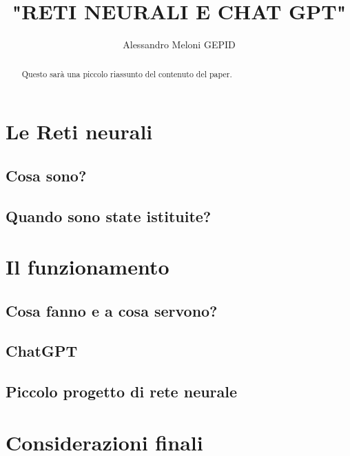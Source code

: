 \documentclass{article}
\title{\textbf{"RETI NEURALI E CHAT GPT"}}
\author{Alessandro Meloni GEPID}
\date{}
\begin{document}
\maketitle
\begin{abstract}
    Questo sarà una piccolo riassunto del contenuto del paper.
\end{abstract}

\centering \tableofcontents
\centering \newpage
\section{Le Reti neurali}

\flushleft \subsection{Cosa sono?}

\flushleft\subsection{Quando sono state istituite?}

\centering \newpage
\section{Il funzionamento}

\flushleft \subsection{Cosa fanno e a cosa servono?}

\flushleft\subsection{ChatGPT}

\flushleft \subsection{Piccolo progetto di rete neurale}

\centering \newpage
\section{Considerazioni finali}
\end{document}
